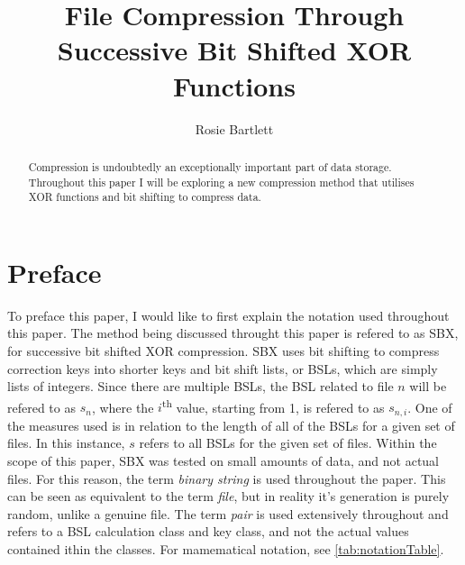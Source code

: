 \documentclass{cup-ino}
\title{File Compression Through Successive Bit Shifted XOR Functions}
\author{Rosie Bartlett}
\begin{document}
\maketitle

\begin{abstract}
Compression is undoubtedly an exceptionally important part of data storage. Throughout this paper I will be exploring a new compression method that utilises XOR functions and bit shifting to compress data.
\end{abstract}

\section{Preface}

To preface this paper, I would like to first explain the notation used throughout this paper. The method being discussed throught this paper is refered to as SBX, for successive bit shifted XOR compression. SBX uses bit shifting to compress correction keys into shorter keys and bit shift lists, or BSLs, which are simply lists of integers. Since there are multiple BSLs, the BSL related to file $n$ will be refered to as $s_n$, where the $i$\textsuperscript{th} value, starting from 1, is refered to as $s_{n,i}$. One of the measures used is in relation to the length of all of the BSLs for a given set of files. In this instance, $s$ refers to all BSLs for the given set of files. Within the scope of this paper, SBX was tested on small amounts of data, and not actual files. For this reason, the term \textit{binary string} is used throughout the paper. This can be seen as equivalent to the term \textit{file}, but in reality it's generation is purely random, unlike a genuine file. The term \textit{pair} is used extensively throughout and refers to a BSL calculation class and key class, and not the actual values contained ithin the classes. For mamematical notation, see \cref{tab:notationTable}.
\end{document}
